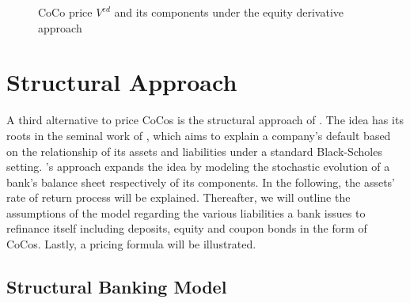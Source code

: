 \begin{figure}[H]
\centering
{}
\caption[CoCo price $V^{ed}$ and its components]{CoCo price $V^{ed}$ and its components under the equity derivative approach}
\label{pricecomponents}
\end{figure}

\section{Structural Approach} \label{sec:structuralapproach}
A third alternative to price CoCos is the structural approach of \citet{pennacchi2010structural}. The idea has its roots in the seminal work of \citet{merton1974pricing}, which aims to explain a company's default based on the relationship of its assets and liabilities under a standard Black-Scholes setting. \citet{pennacchi2010structural}'s approach expands the idea by modeling the stochastic evolution of a bank's balance sheet respectively of its components. In the following, the assets' rate of return process will be explained. Thereafter, we will outline the assumptions of the model regarding the various liabilities a bank issues to refinance itself including deposits, equity and coupon bonds in the form of CoCos. Lastly, a pricing formula will be illustrated.

\subsection{Structural Banking Model}
